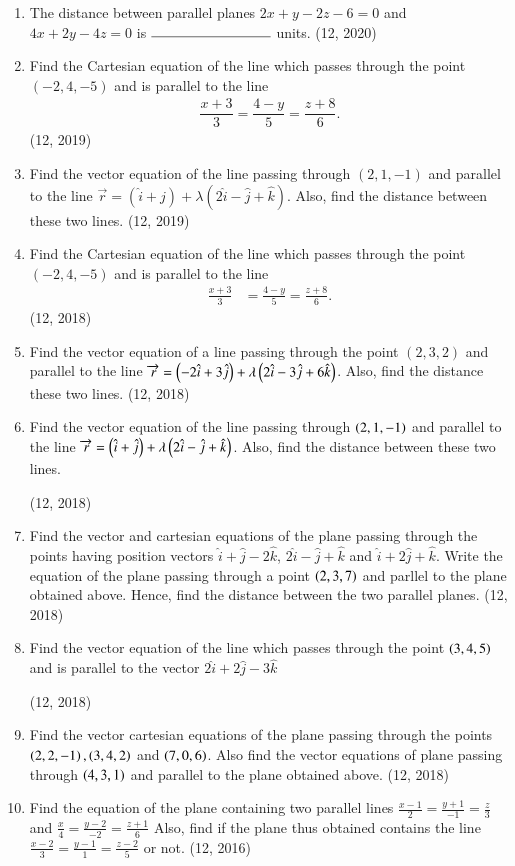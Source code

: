\begin{enumerate}[label=\thesubsection.\arabic*, ref=\thesubsection.\theenumi]
\item The distance between parallel planes $2x + y - 2z - 6 = 0$ and $4x + 2y - 4z = 0$ is $\rule{3cm}{0.15mm}$ units.
\hfill (12, 2020)
	\item Find the Cartesian equation of the line which passes through the point $(-2, 4, -5)$ and is parallel to the line
	\begin{align*}
	\dfrac{x+3}{3} = \dfrac{4-y}{5} = \dfrac{z+8}{6}.
	\end{align*} \hfill (12, 2019)
	\item Find the vector equation of the line passing through $(2, 1, -1)$ and parallel to the line $\overrightarrow{r} = (\hat{i} + \hat{j}) + \lambda (2\hat{i} - \hat{j} + \hat{k})$. Also, find the distance between these two lines. \hfill (12, 2019)
\item Find the Cartesian equation of the line which passes through the point $(-2, 4, -5)$ and is parallel to the line 
\begin{align*}
\frac{x + 3}{3} &= \frac{4 - y}{5} = \frac{z + 8}{6}.
\end{align*}
\hfill (12, 2018)
\item Find the vector equation of a line passing through the point $(2,3,2)$ and parallel to the line $\overrightarrow{r} = \left(-2\hat{i}+3\hat{j}\right)+\lambda\left(2\hat{i}-3\hat{j}+6\hat{k}\right)$. Also, find the distance these two lines.
\hfill (12, 2018) 
\item  Find the vector equation of the line passing through $\left(2, 1, -1\right)$ and parallel to the line $\overrightarrow{r}=\left(\hat{i}+\hat{j}\right)+\lambda\left(2\hat{i}-\hat{j}+\hat{k}\right)$. Also, find the distance between these two lines.

\hfill (12, 2018) 
\item Find the vector and cartesian equations of the plane passing through the points having position vectors $\hat{i} + \hat{ j} - 2\hat{k}$, $2\hat{i}-\hat{j} + \hat{k}$ and $\hat{i} + 2\hat{j} + \hat{k}$. Write the equation of the plane passing through a point $\left(2,3,7\right)$ and parllel to the plane obtained above. Hence, find the distance between the two parallel planes.
\hfill (12, 2018) 
\item Find the vector equation of the line which passes through the point $\left(3,4,5\right)$ and is parallel to the vector $2\hat{i}+2\hat{j}-3\hat{k}$

\hfill (12, 2018) 
\item Find the vector cartesian equations of the plane passing through the points $\left(2,2,-1\right),\left(3,4,2\right)$ and $\left(7,0,6\right)$. Also find the vector equations of plane passing through $\left(4,3,1\right)$ and parallel to the plane obtained above.
\hfill (12, 2018) 
\item Find the equation of the plane containing two parallel lines
      $\frac{x-1}{2} = \frac{y+1}{-1} = \frac{z}{3}$ and $\frac{x}{4} = \frac{y-2}{-2} = \frac{z+1}{6}$
      Also, find if the plane thus obtained contains the line
      $\frac{x-2}{3} =\frac{y-1}{1} = \frac{z-2}{5}$ or not. \hfill (12, 2016)

\end{enumerate}
